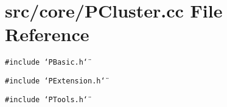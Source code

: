 \section{src/core/PCluster.cc File Reference}
\label{PCluster_8cc}


{\tt \#include \char`\"{}PBasic.h\char`\"{}}\par
{\tt \#include \char`\"{}PExtension.h\char`\"{}}\par
{\tt \#include \char`\"{}PTools.h\char`\"{}}\par
